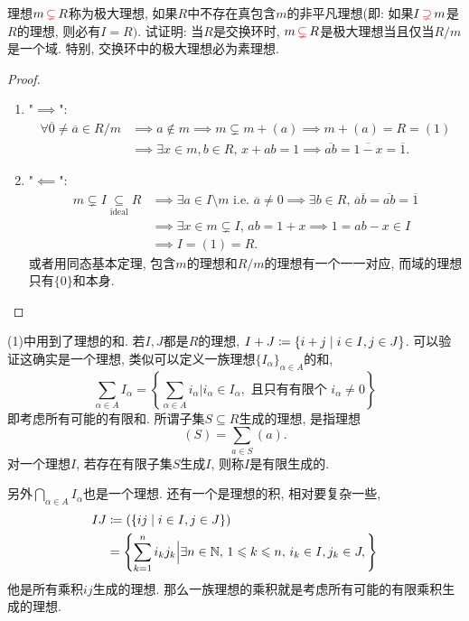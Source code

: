 \begin{problem}\label{ex:2.1.6}
    理想$m \,\textcolor{red}{\subsetneq}\, R$称为极大理想, 如果$R$中不存在真包含$m$的非平凡理想(即: 如果$I \,\textcolor{red}{\supsetneq}\, m$是$R$的理想, 则必有$I = R)$. 试证明: 当$R$是交换环时, $m \,\textcolor{red}{\subsetneq}\, R$是极大理想当且仅当$R/m$是一个域. 特别, 交换环中的极大理想必为素理想.
\end{problem}

\begin{proof}
    \begin{enumerate}[(1)]
        \item "$\implies$":
        \[
        \begin{aligned}
            \forall \overline{0} \neq \overline{a} \in R/m &\implies a \notin m \implies m \subsetneq m + (a) \implies m + (a) = R = (1)\\
            &\implies \exists x \in m, b \in R,\, x + ab = 1 \implies \overline{ab} = \overline{1 - x} = \overline{1}.
        \end{aligned}
        \]
        \item "$\impliedby$":
        \[
        \begin{aligned}
            m \subsetneq I \underset{\text{ideal}}{\subseteq} R &\implies \exists a \in I \setminus m \text{ i.e. } \overline{a} \neq 0 \implies \exists b \in R,\, \overline{a}\overline{b} = \overline{ab} = \overline{1}\\
            &\implies \exists x \in m \subsetneq I,\, ab = 1 + x \implies 1 = ab - x \in I \\
            &\implies I = (1) = R.
        \end{aligned}
        \]
        或者用同态基本定理, 包含$m$的理想和$R/m$的理想有一个一一对应, 而域的理想只有$\{0\}$和本身.
    \end{enumerate}
\end{proof}

\begin{remark}
    (1)中用到了理想的和. 若$I, J$都是$R$的理想, $I + J \mathrel{\coloneqq} \{i + j \mid i \in I, j \in J\}$. 可以验证这确实是一个理想, 类似可以定义一族理想$\{I_\alpha\}_{\alpha \in A}$的和,
    \[
        \sum_{\alpha \in A} I_\alpha = \left\{\sum_{\alpha \in A} i_\alpha \Big| i_\alpha \in I_\alpha, \text{ 且只有有限个 } i_\alpha \neq 0 \right\}
    \]
    即考虑所有可能的有限和. 所谓子集$S \subseteq R$生成的理想, 是指理想
    \[
        (S) = \sum_{a \in S} (a).
    \]
    对一个理想$I$, 若存在有限子集$S$生成$I$, 则称$I$是有限生成的.
    
    另外$\bigcap_{\alpha \in A} I_\alpha$也是一个理想. 还有一个是理想的积, 相对要复杂一些,
    \[
    \begin{aligned}
        IJ &\mathrel{\coloneqq} (\{ij \mid i \in I, j \in J\})\\
        &= \left\{\sum_{k = 1}^{n} i_kj_k \Big| \exists n \in \mathbb{N},\, 1 \leqslant k \leqslant n,\, i_k \in I, j_k \in J, \right\}
    \end{aligned}
    \]
    他是所有乘积$ij$生成的理想. 那么一族理想的乘积就是考虑所有可能的有限乘积生成的理想.
\end{remark}

